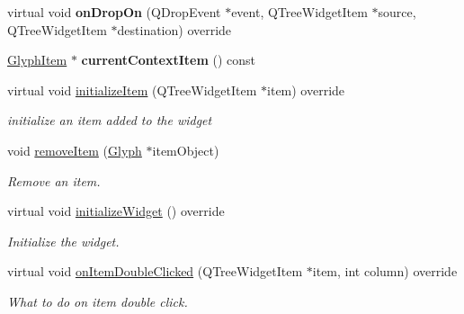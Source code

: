 \begin{Indent}
\begin{DoxyCompactItemize}
virtual void {\bfseries on\+Drop\+On} (Q\+Drop\+Event $\ast$event, Q\+Tree\+Widget\+Item $\ast$source, Q\+Tree\+Widget\+Item $\ast$destination) override
\item 
\mbox{\label{classrev_1_1_view_1_1_canvas_glyph_widget_af23c9b4c7bc186391e7c8e523bab3ac8}} 
\mbox{\hyperlink{classrev_1_1_view_1_1_glyph_item}{Glyph\+Item}} $\ast$ {\bfseries current\+Context\+Item} () const
\item 
\mbox{\label{classrev_1_1_view_1_1_canvas_glyph_widget_ae209121aeb288cea8abcdc13e3df5f1e}} 
virtual void \mbox{\hyperlink{classrev_1_1_view_1_1_canvas_glyph_widget_ae209121aeb288cea8abcdc13e3df5f1e}{initialize\+Item}} (Q\+Tree\+Widget\+Item $\ast$item) override
\begin{DoxyCompactList}\small\item\em initialize an item added to the widget \end{DoxyCompactList}\item 
\mbox{\label{classrev_1_1_view_1_1_canvas_glyph_widget_a41dadb3beaeab732ad2891d52a6bd4a2}} 
void \mbox{\hyperlink{classrev_1_1_view_1_1_canvas_glyph_widget_a41dadb3beaeab732ad2891d52a6bd4a2}{remove\+Item}} (\mbox{\hyperlink{classrev_1_1_glyph}{Glyph}} $\ast$item\+Object)
\begin{DoxyCompactList}\small\item\em Remove an item. \end{DoxyCompactList}\item 
\mbox{\label{classrev_1_1_view_1_1_canvas_glyph_widget_a98ef28ac69a1af08a196a32b9c08fbab}} 
virtual void \mbox{\hyperlink{classrev_1_1_view_1_1_canvas_glyph_widget_a98ef28ac69a1af08a196a32b9c08fbab}{initialize\+Widget}} () override
\begin{DoxyCompactList}\small\item\em Initialize the widget. \end{DoxyCompactList}\item 
\mbox{\label{classrev_1_1_view_1_1_canvas_glyph_widget_aa9e3961dd6ef959d2e5303f87429dd67}} 
virtual void \mbox{\hyperlink{classrev_1_1_view_1_1_canvas_glyph_widget_aa9e3961dd6ef959d2e5303f87429dd67}{on\+Item\+Double\+Clicked}} (Q\+Tree\+Widget\+Item $\ast$item, int column) override
\begin{DoxyCompactList}\small\item\em What to do on item double click. \end{DoxyCompactList}\end{DoxyCompactItemize}
\end{Indent}

